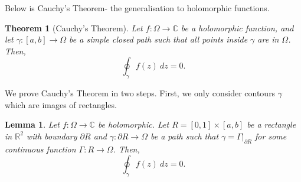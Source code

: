 \documentclass[a4paper, openany]{memoir}
\theoremstyle{definition}
\theoremstyle{plain}
\newtheorem{theorem}[definition]{Theorem}
\newtheorem{lemma}[definition]{Lemma}
\begin{document}
Below is Cauchy's Theorem- the generalisation to holomorphic functions. 
\begin{theorem}[Cauchy's Theorem]
Let $f: \Omega \to \mathbb{C}$ be a holomorphic function, and let $\gamma: [a, b] \to \Omega$ be a simple closed path such that all points inside $\gamma$ are in $\Omega$. Then,
\[\oint_\gamma f(z) \ dz = 0.\]
\end{theorem}
We prove Cauchy's Theorem in two steps. First, we only consider contours $\gamma$ which are images of rectangles.
\begin{lemma}
Let $f: \Omega \to \mathbb{C}$ be holomorphic. Let $R = [0, 1] \times [a, b]$ be a rectangle in $\mathbb{R}^2$ with boundary $\partial R$ and $\gamma: \partial R \to \Omega$ be a path such that $\gamma = \Gamma|_{\partial R}$ for some continuous function $\Gamma: R \to \Omega$. Then,
\[\oint_\gamma f(z) \ dz = 0.\]
\end{lemma}
\end{document}
